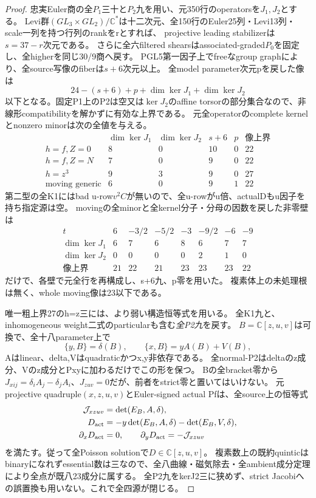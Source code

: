 \documentclass[a4paper,11pt]{ltjsarticle}
\theoremstyle{definition}
\begin{document}
\begin{proof}
忠実Euler商の全$P_1$三十と$P_2$九を用い、元350行のoperatorsを$J_1,J_2$とする。
Levi群$(GL_3\times GL_2)/\mathbb C^*$は十二次元、全150行のEuler25列・Levi13列・scale一列を持つ行列のrankをrとすれば、
projective leading stabilizerは$s=37-r$次元である。
さらに全六filtered shearsはassociated-graded$P_0$を固定し、全higherを同じ30/9商へ戻す。
PGL5第一因子上でfreeなgroup graphにより、全source写像のfiberは$s+6$次元以上。
全model parameter次元pを戻した像は
\[
 24-(s+6)+p+\dim\ker J_1+\dim\ker J_2
\]
以下となる。固定P1上のP2は空又は$\ker J_2$のaffine torsorの部分集合なので、非線形compatibilityを解かずに有効な上界である。
元全operatorのcomplete kernelとnonzero minorは次の全値を与える。
\[
\begin{array}{c|c|c|c|c|c}
 &\dim\ker J_1&\dim\ker J_2&s+6&p&\text{像上界}\\\hline
 h=f,Z=0&8&0&10&0&22\\
 h=f,Z=N&7&0&9&0&22\\
 h=z^3&9&3&9&0&27\\
 \text{moving generic}&6&0&9&1&22
\end{array}
\]
第二型の全K1にはbad u-row$v^2C$が無いので、全u-rowがu倍、actualDもu因子を持ち指定源は空。
movingの全minorと全kernel分子・分母の因数を戻した非零壁は
\[
\begin{array}{c|rrrrrrr}
 t&6&-3/2&-5/2&-3&-9/2&-6&-9\\\hline
 \dim\ker J_1&6&7&6&8&6&7&7\\
 \dim\ker J_2&0&0&0&0&2&1&0\\
 \text{像上界}&21&22&21&23&23&23&22
\end{array}
\]
だけで、各壁で元全行を再構成し、s+6九、p零を用いた。
複素体上の未処理根は無く、whole moving像は23以下である。

唯一粗上界27のh=z三には、より弱い構造恒等式を用いる。
全K1九と、inhomogeneous weight二式のparticularも含む\emph{全P2九}を戻す。
$B=\mathbb C[z,u,v]$は可換で、全十八parameter上で
\[
 \{y,B\}=\delta(B),\qquad \{x,B\}=yA(B)+V(B),
\]
Aはlinear、delta,Vはquadraticかつx,y非依存である。
全normal-P2はdeltaのz成分、Vのz成分とPxyに加わるだけでこの形を保つ。
Bの全bracket零から$J_{xij}=\delta_iA_j-\delta_jA_i$、$J_{zuv}=0$だが、前者をstrict零と置いてはいけない。
元projective quadruple$(x,z,u,v)$とEuler-signed actual Pfは、全source上の恒等式
\[
\begin{split}
 \mathcal J_{xzuv}&=\det(E_B,A,\delta),\\
 D_{\rm act}&=-y\det(E_B,A,\delta)-\det(E_B,V,\delta),\\
 \partial_xD_{\rm act}&=0,\qquad
 \partial_yD_{\rm act}=-\mathcal J_{xzuv}
\end{split}
\]
を満たす。従って全Poisson solutionで$D\in\mathbb C[z,u,v]$。
複素数上の既約quinticはbinaryになれずessential数は三なので、全八曲線・磁気除去・全ambient成分定理により全点が既八23成分に属する。
全P2九をkerJ2三に狭めず、strict Jacobiへの誤置換も用いない。これで全四源が閉じる。
\end{proof}
\end{document}

